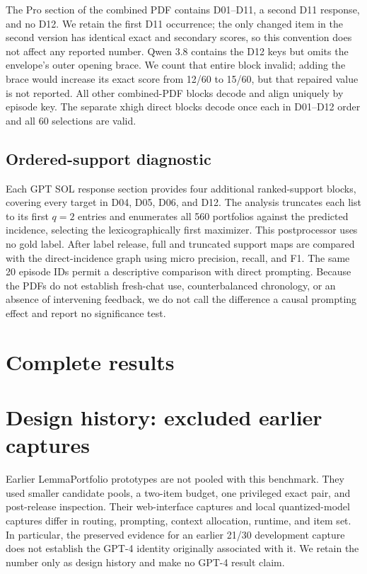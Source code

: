 The Pro section of the combined PDF contains D01--D11, a second D11 response,
and no D12.  We retain the first
D11 occurrence; the only changed item in the second version has identical exact
and secondary scores, so this convention does not affect any reported number.
Qwen 3.8 contains the D12 keys but omits the envelope's outer opening brace.
We count that entire block invalid; adding the brace would increase its exact
score from 12/60 to 15/60, but that repaired value is not reported.  All other
combined-PDF blocks decode and align uniquely by episode key.  The separate
xhigh direct blocks decode once each in D01--D12 order and all 60 selections
are valid.

\subsection{Ordered-support diagnostic}

Each GPT SOL response section provides four additional ranked-support blocks, covering every
target in D04, D05, D06, and D12.  The analysis truncates each list to its
first $q=2$ entries and enumerates all 560 portfolios against the predicted
incidence, selecting the lexicographically first maximizer.  This postprocessor
uses no gold label.  After label release, full and truncated support maps are
compared with the direct-incidence graph using micro precision, recall, and F1.
The same 20 episode IDs permit a descriptive comparison with direct prompting.
Because the PDFs do not establish fresh-chat use, counterbalanced chronology,
or an absence of intervening feedback, we do not call the difference a causal
prompting effect and report no significance test.

\section{Complete results}



\section{Design history: excluded earlier captures}

Earlier LemmaPortfolio prototypes are not pooled with this benchmark.  They
used smaller candidate pools, a two-item budget, one privileged exact pair,
and post-release inspection.  Their web-interface captures and local
quantized-model captures differ in routing, prompting, context allocation,
runtime, and item set.  In particular, the preserved evidence for an earlier
21/30 development capture does not establish the GPT-4 identity originally
associated with it.  We retain the number only as design history and make no
GPT-4 result claim.

